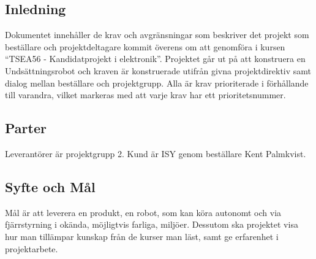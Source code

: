 \documentclass[11pt]{article}
\begin{document}
\pagebreak


\begin{flushleft}

\section{Inledning}
Dokumentet innehåller de krav och avgränsningar som beskriver det projekt som beställare och projektdeltagare kommit överens om att genomföra i kursen “TSEA56 - Kandidatprojekt i elektronik”. Projektet går ut på att konstruera en Undsättningsrobot och kraven är konstruerade utifrån givna projektdirektiv samt dialog mellan beställare och projektgrupp.
Alla är krav prioriterade i förhållande till varandra, vilket markeras med att varje krav har ett prioritetsnummer.

\subsection{Parter}
Leverantörer är projektgrupp 2. Kund är ISY genom beställare Kent Palmkvist.

\subsection{Syfte och Mål}
Mål är att leverera en produkt, en robot, som kan köra autonomt och via fjärrstyrning i okända, möjligtvis farliga, miljöer. Dessutom ska projektet visa hur man tillämpar kunskap från de kurser man läst, samt ge erfarenhet i projektarbete.

\pagebreak


\end{flushleft}
\end{document}
